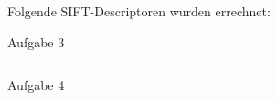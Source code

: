 Folgende SIFT-Descriptoren wurden errechnet:

Aufgabe 3
\lstset{language=matlab}
\begin{lstlisting}[caption={Berechnung des SIFT-Descriptor-Vektors}]

\end{lstlisting}

Aufgabe 4
\lstset{language=matlab}
\begin{lstlisting}[caption={Berechnung des SIFT-Descriptor-Vektors}]

\end{lstlisting}



